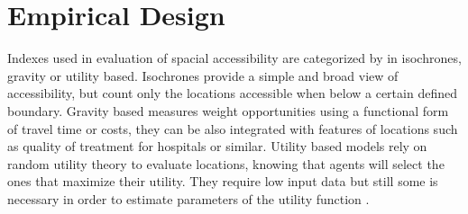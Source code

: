 \documentclass[11pt, titlepage]{article}
\begin{document}
\section{Empirical Design}
\label{edesign}
Indexes used in evaluation of spacial accessibility are  categorized by \cite{marwal_literature_2022} in isochrones, gravity or utility based. Isochrones provide a simple and broad view of accessibility, but count only the locations accessible when below a certain defined boundary. Gravity based measures weight opportunities using  a functional form of travel time or costs, they can be also integrated with features of locations such as quality of treatment for hospitals or similar. Utility based models rely on random utility theory to evaluate locations, knowing that agents will select the ones that maximize their utility. They require low input data but still some is necessary in order to estimate parameters of the utility function \parencite{ziemke_accessibility_2018}.
\end{document}
